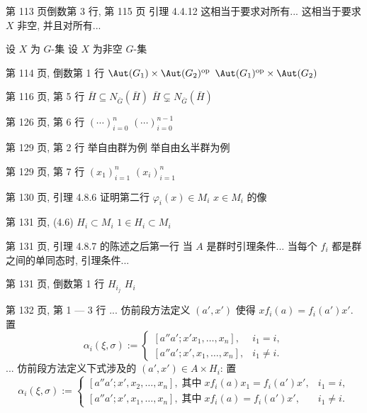 \documentclass{AJerrata}
\begin{document}
\begin{Errata}
        \item[第 113 页倒数第 3 行, 第 115 页 引理 4.4.12]
        \Orig 这相当于要求对所有...
        \newline
        \Corr 这相当于要求 $X$ 非空, 并且对所有...
        
        \Orig 设 $X$ 为 $G$-集
        \Corr 设 $X$ 为非空 $G$-集
        
        \item[第 114 页, 倒数第 1 行]
        \Orig $\Aut(G_1) \times \Aut(G_2)^{\mathrm{op}}$
        \Corr $\Aut(G_1)^{\mathrm{op}} \times \Aut(G_2)$
        
        \item[第 116 页, 第 5 行]
        \Orig $\bar{H} \subseteq N_{\bar{G}}(\bar{H})$
        \Corr $\bar{H} \subsetneq N_{\bar{G}}(\bar{H})$

		\item[第 126 页, 第 6 行]
		\Orig $\left( \cdots \right)_{i=0}^n$
		\Corr $\left( \cdots \right)_{i=0}^{n-1}$
		
		\item[第 129 页, 第 2 行]
		\Orig 举自由群为例
		\Corr 举自由幺半群为例
		
		\item[第 129 页, 第 7 行]
		\Orig $(x_1)_{i=1}^n$
		\Corr $(x_i)_{i=1}^n$
		
		\item[第 130 页, 引理 4.8.6 证明第二行]
		\Orig $\varphi_i(x) \in M_i$
		\Corr $x \in M_i$ 的像
		
		\item[第 131 页, (4.6)]
		\Orig $H_i \subset M_i$
		\Corr $1 \in H_i \subset M_i$
		
		\item[第 131 页, 引理 4.8.7 的陈述之后第一行]
		\Orig 当 $A$ 是群时引理条件...
		\Corr 当每个 $f_i$ 都是群之间的单同态时, 引理条件...
		
		\item[第 131 页, 倒数第 1 行]
		\Orig $H_{i_j}$
		\Corr $H_i$
		
		\item[第 132 页, 第 1 --- 3 行]
		\Orig ... 仿前段方法定义 $(a', x')$ 使得 $x f_i(a) = f_i(a')x'$. 置
		\[ \alpha_i(\xi, \sigma) :=
		\begin{cases}
			[a'' a'; x'x_1, \ldots, x_n], & i_1 = i, \\
			[a'' a'; x', x_1, \ldots, x_n], & i_1 \neq i.
		\end{cases} \]
		\Corr ... 仿前段方法定义下式涉及的 $(a', x') \in A \times H_i$: 置
		\[ \alpha_i(\xi, \sigma) :=
		\begin{cases}
			[a'' a'; x', x_2, \ldots, x_n], \;\text{其中}\; x f_i(a) x_1 = f_i(a') x', & i_1 = i, \\
			[a'' a'; x', x_1, \ldots, x_n], \;\text{其中}\; x f_i(a) = f_i(a') x', & i_1 \neq i.
		\end{cases} \]
		

\end{Errata}
\end{document}
